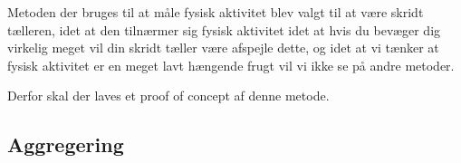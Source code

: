 Metoden der bruges til at måle fysisk aktivitet blev valgt til at være skridt tælleren, idet at den tilnærmer sig fysisk aktivitet idet at hvis du bevæger dig virkelig meget vil din skridt tæller være afspejle dette, og idet at vi tænker at fysisk aktivitet er en meget lavt hængende frugt vil vi ikke se på andre metoder. 

Derfor skal der laves et proof of concept af denne metode. 


\subsection{Aggregering}